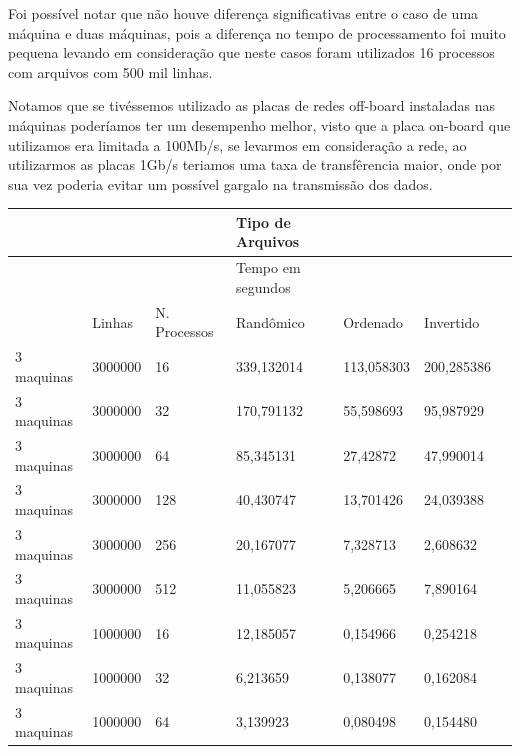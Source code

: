 \documentclass[12pt]{article}
\begin{document}
Foi possível notar que não houve diferença significativas entre o caso de uma máquina e duas máquinas, pois a diferença no tempo de processamento foi muito pequena levando em consideração que neste casos foram utilizados 16 processos com arquivos com 500 mil linhas.

Notamos que se tivéssemos utilizado as placas de redes off-board instaladas nas máquinas poderíamos ter um desempenho melhor, visto que a placa on-board que utilizamos era limitada a 100Mb/s, se levarmos em consideração a rede, ao utilizarmos as placas 1Gb/s teriamos uma taxa de transfêrencia maior, onde por sua vez poderia evitar um possível gargalo na transmissão dos dados.



\begin{table}[]
\begin{tabular}{l|llllll}
           &                 &                     & Tipo de Arquivos  &            &            \\  \hline
           &                 &                     & Tempo em segundos &            &            \\ \hline
        & Linhas     & N. Processos      & Randômico         & Ordenado   & Invertido  \\ \hline
3 maquinas & 3000000    & 16              & 339,132014          & 113,058303        & 200,285386 \\
3 maquinas & 3000000    & 32              & 170,791132          & 55,598693         & 95,987929  &            \\
3 maquinas & 3000000    & 64              & 85,345131           & 27,42872          & 47,990014  &            \\
3 maquinas & 3000000    & 128             & 40,430747           & 13,701426         & 24,039388  &            \\
3 maquinas & 3000000    & 256             & 20,167077           & 7,328713          & 2,608632   &            \\
3 maquinas & 3000000    & 512             & 11,055823           & 5,206665          & 7,890164   &            \\
3 maquinas & 1000000    & 16              & 12,185057           & 0,154966          & 0,254218   &            \\
3 maquinas & 1000000    & 32              & 6,213659            & 0,138077          & 0,162084   &            \\
3 maquinas & 1000000    & 64              & 3,139923            & 0,080498          & 0,154480   &            \\

\end{tabular}
\end{table}
\end{document}
